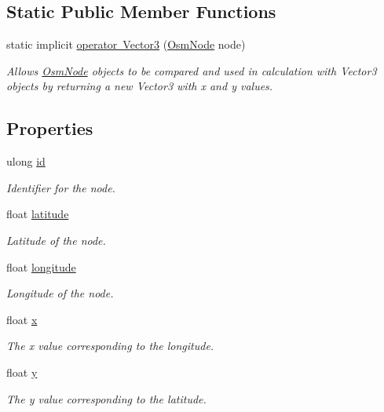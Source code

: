 \subsection*{Static Public Member Functions}
\begin{DoxyCompactItemize}
\item 
static implicit \mbox{\hyperlink{class_osm_node_a5745eaf8dbc5fc470a77d83c3f74d308}{operator Vector3}} (\mbox{\hyperlink{class_osm_node}{Osm\+Node}} node)
\begin{DoxyCompactList}\small\item\em Allows \mbox{\hyperlink{class_osm_node}{Osm\+Node}} objects to be compared and used in calculation with Vector3 objects by returning a new Vector3 with x and y values. \end{DoxyCompactList}\end{DoxyCompactItemize}
\subsection*{Properties}
\begin{DoxyCompactItemize}
\item 
ulong \mbox{\hyperlink{class_osm_node_a31333793a614f2f7672bdc8b66867c0a}{id}}
\begin{DoxyCompactList}\small\item\em Identifier for the node. \end{DoxyCompactList}\item 
float \mbox{\hyperlink{class_osm_node_af5aae5cbf72b4256a6d5fead9252e9bf}{latitude}}
\begin{DoxyCompactList}\small\item\em Latitude of the node. \end{DoxyCompactList}\item 
float \mbox{\hyperlink{class_osm_node_a65db270bef3d8c55822b410ed137ec7c}{longitude}}
\begin{DoxyCompactList}\small\item\em Longitude of the node. \end{DoxyCompactList}\item 
float \mbox{\hyperlink{class_osm_node_ac27a7d0bdad566917ca5d11dcc311f04}{x}}
\begin{DoxyCompactList}\small\item\em The x value corresponding to the longitude. \end{DoxyCompactList}\item 
float \mbox{\hyperlink{class_osm_node_a4873f9b229e3aa49eabaaa4b7feb6666}{y}}
\begin{DoxyCompactList}\small\item\em The y value corresponding to the latitude. \end{DoxyCompactList}\end{DoxyCompactItemize}
